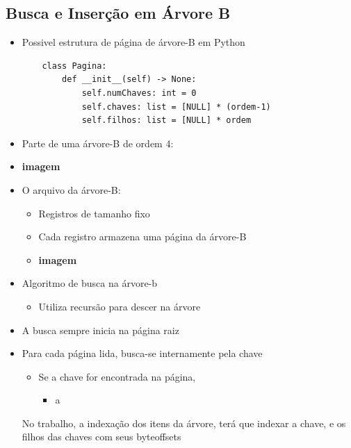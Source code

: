 \documentclass[12pt]{article}
\begin{document}
    \subsection{Busca e Inserção em Árvore B}
        \begin{itemize}
            \item Possivel estrutura de página de árvore-B em Python
            \begin{verbatim}
    class Pagina:
        def __init__(self) -> None:
            self.numChaves: int = 0
            self.chaves: list = [NULL] * (ordem-1)
            self.filhos: list = [NULL] * ordem\end{verbatim}
            \item Parte de uma árvore-B de ordem 4:
            \item \textbf{imagem}
            \item O arquivo da árvore-B:
            \begin{itemize}
                \item Registros de tamanho fixo
                \item Cada registro armazena uma página da árvore-B
                \item \textbf{imagem}
            \end{itemize}
            \item Algoritmo de busca na árvore-b
            \begin{itemize}
                \item Utiliza recursão para descer na árvore
            \end{itemize}
            \item A busca sempre inicia na página raiz
            \item Para cada página lida, busca-se internamente pela chave
            \begin{itemize}
                \item Se a chave for encontrada na página, 
                \begin{itemize}
                    \item a
                \end{itemize}
            \end{itemize}
            


            \begin{scriptsize}
                No trabalho, a indexação dos itens da árvore, terá que indexar a 
            chave, e os filhos das chaves com seus byteoffsets
            \end{scriptsize} 
        \end{itemize}
\end{document}
